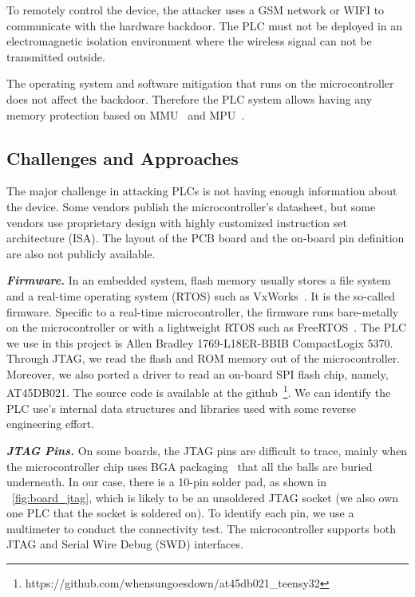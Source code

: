To remotely control the device, the attacker uses a GSM network or WIFI to communicate with the hardware backdoor. The PLC must not be deployed in an electromagnetic isolation environment where the wireless signal can not be transmitted outside.

The operating system and software mitigation that runs on the microcontroller does not affect the backdoor. Therefore the PLC system allows having any memory protection based on MMU~\cite{shalan2000dynamic} and MPU~\cite{kim2018securing}.


\subsection{Challenges and Approaches}

The major challenge in attacking PLCs is not having enough information about the device. Some vendors publish the microcontroller's datasheet, but some vendors use proprietary design with highly customized instruction set architecture (ISA).  The layout of the PCB board and the on-board pin definition are also not publicly available.


\textbf{\textit{Firmware.}} In an embedded system, flash memory usually stores a file system and a real-time operating system (RTOS) such as VxWorks~\cite{neugass1991vxworks}. It is the so-called firmware. Specific to a real-time microcontroller, the firmware runs bare-metally on the microcontroller or with a lightweight RTOS such as FreeRTOS~\cite{barry2008freertos}. The PLC we use in this project is Allen Bradley 1769-L18ER-BBIB CompactLogix 5370. Through JTAG, we read the flash and ROM memory out of the microcontroller.
Moreover, we also ported a driver to read an on-board SPI flash chip, namely, AT45DB021. The source code is available at the github~\footnote{https://github.com/whensungoesdown/at45db021\_teensy32}.  We can identify the PLC use's internal data structures and libraries used with some reverse engineering effort.


\textbf{\textit{JTAG Pins.}} On some boards, the JTAG pins are difficult to trace, mainly when the microcontroller chip uses BGA packaging~\cite{joshi2000mosfet} that all the balls are buried underneath. In our case, there is a 10-pin solder pad, as shown in ~\autoref{fig:board_jtag}, which is likely to be an unsoldered JTAG socket (we also own one PLC that the socket is soldered on).  To identify each pin, we use a multimeter to conduct the connectivity test. The microcontroller supports both JTAG and Serial Wire Debug (SWD)\cite{ashfieldserial} interfaces.


